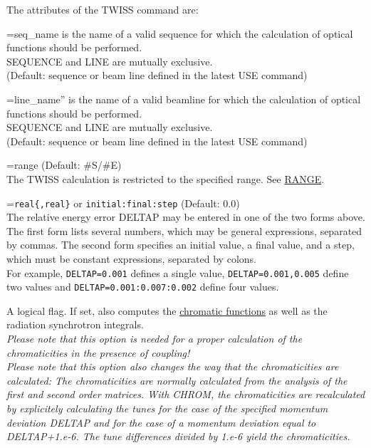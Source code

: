 The  attributes of the TWISS command are: 
\begin{madlist}
    =seq\_name is the name of a valid sequence for
  which the calculation of optical functions should be performed. \\ 
  SEQUENCE and LINE are mutually exclusive.\\
  (Default: sequence or beam line defined in the latest USE command)

   =line\_name'' is the name of a valid beamline for which
  the calculation of optical functions should be performed. \\
  SEQUENCE and LINE are mutually exclusive. \\
  (Default: sequence or beam line defined in the latest USE command)
  
  =range (Default: \#S/\#E)\\
  The TWISS calculation is restricted to the specified range.
  See \href{../Introduction/ranges.html#range}{RANGE}.  

  ={\tt real\{,real\}} or {\tt initial:final:step}  (Default: 0.0)\\
  The relative energy error DELTAP may be entered in one of the two
  forms above. \\
  The first form lists several numbers, which may be general expressions,
  separated by commas. The second form specifies an initial value, a final
  value, and a step, which must be constant expressions, separated by
  colons. \\
  For example, {\tt DELTAP=0.001} defines a single value, 
  {\tt DELTAP=0.001,0.005} define two values and 
  {\tt DELTAP=0.001:0.007:0.002} define four values. 


   A logical flag. If set, \madx also computes the
  \href{../Introduction/tables.html#chrom}{chromatic
    functions} as well as the radiation synchrotron integrals. \\
  \textit{Please note that this option is needed for a proper
    calculation of the chromaticities in the presence of coupling!}\\
  \textit{Please note that this option also changes the way that the
    chromaticities are calculated: The chromaticities are normally
    calculated from the analysis of the first and second order
    matrices. With CHROM, the chromaticities are recalculated by
    explicitely calculating the tunes for the case of the specified momentum
    deviation DELTAP and for the case of a momentum deviation equal
    to DELTAP+1.e-6. The tune differences divided by 1.e-6 yield the
    chromaticities.}


\end{madlist}

